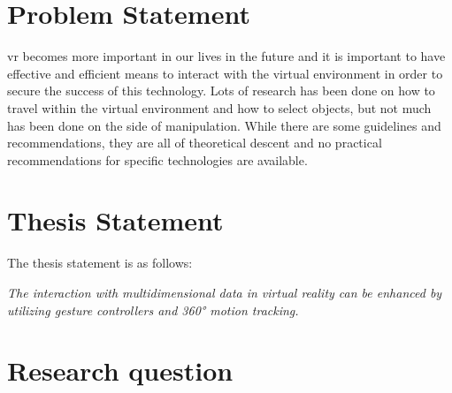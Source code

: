 
\section{Problem Statement}

\gls{vr} becomes more important in our lives in the future and it is important to have effective and efficient means to interact with the virtual environment in order to secure the success of this technology. Lots of research has been done on how to travel within the virtual environment and how to select objects, but not much has been done on the side of manipulation. While there are some guidelines and recommendations, they are all of theoretical descent and no practical recommendations for specific technologies are available.



\section{Thesis Statement}

The thesis statement is as follows:
\begin{framed}
	\textit{The interaction with multidimensional data in virtual reality can be enhanced by utilizing gesture controllers and 360° motion tracking.}
\end{framed} \label{TS}



\section{Research question}

